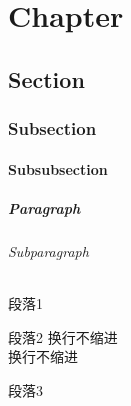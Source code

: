 \documentclass[UTF8]{ctexrep}
\begin{document}
%
\chapter{Chapter}
\section{Section}
\subsection{Subsection}
\subsubsection{Subsubsection}
\paragraph{Paragraph}
\subparagraph{Subparagraph}

%
\clearpage
\par 段落1
\par 段落2
\newline 换行不缩进
\\ 换行不缩进
\par{段落3}
\end{document}
